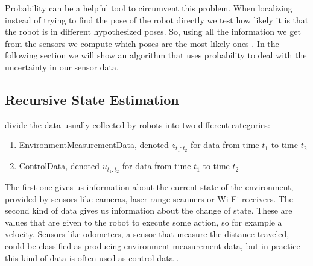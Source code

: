 Probability can be a helpful tool to circumvent this problem. When localizing instead of trying to find the pose of the robot directly we test how likely it is that the robot is in different hypothesized poses. So, using all the information we get from the sensors we compute which poses are the most likely ones \citep[p.\ 5]{Thrun:2005:PR:1121596}. In the following section we will show an algorithm that uses probability to deal with the uncertainty in our sensor data.
\subsection{Recursive State Estimation}
\citet{Thrun:2005:PR:1121596} divide the data usually collected by robots into two different categories:
\begin{enumerate}
	\setlength\itemsep{0 em}
	\item \Gls{EnvironmentMeasurementData}, denoted $z_{t_1:t_2}$ for data from time $t_1$ to time $t_2$
	\item \Gls{ControlData}, denoted $u_{t_1:t_2}$ for data from time $t_1$ to time $t_2$
\end{enumerate}
The first one gives us information about the current state of the environment, provided by sensors like cameras, laser range scanners or Wi-Fi receivers. The second kind of data gives us information about the change of state. These are values that are given to the robot to execute some action, so for example a velocity. Sensors like odometers, a sensor that measure the distance traveled, could be classified as producing environment measurement data, but in practice this kind of data is often used as control data \citep[p.\ 22-23]{Thrun:2005:PR:1121596}.

